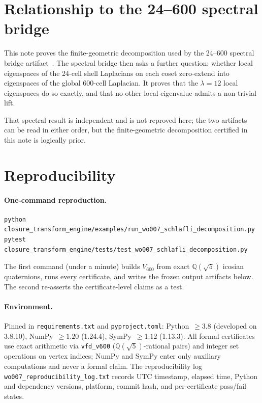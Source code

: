 \documentclass[11pt]{article}
\newcommand{\Vsix}{V_{600}}
\theoremstyle{plain}
\theoremstyle{definition}
\begin{document}
\section{Relationship to the 24--600 spectral bridge}

This note proves the finite-geometric decomposition used by the
24--600 spectral bridge artifact~\cite{Smart24600Bridge}.  The
spectral bridge then asks a further question: whether local
eigenspaces of the 24-cell shell Laplacians on each coset
zero-extend into eigenspaces of the global 600-cell Laplacian.  It
proves that the $\lambda{=}12$ local eigenspaces do so exactly, and
that no other local eigenvalue admits a non-trivial lift.

That spectral result is independent and is not reproved here; the
two artifacts can be read in either order, but the finite-geometric
decomposition certified in this note is logically prior.

\section{Reproducibility}\label{sec:repro}

\paragraph{One-command reproduction.}
\begin{verbatim}
python closure_transform_engine/examples/run_wo007_schlafli_decomposition.py
pytest  closure_transform_engine/tests/test_wo007_schlafli_decomposition.py
\end{verbatim}
The first command (under a minute) builds $\Vsix$ from exact
$\mathbb{Q}(\sqrt 5)$ icosian quaternions, runs every certificate,
and writes the frozen output artifacts below.  The second
re-asserts the certificate-level claims as a test.

\paragraph{Environment.}
Pinned in \texttt{requirements.txt} and \texttt{pyproject.toml}:
Python~$\ge 3.8$ (developed on 3.8.10), NumPy~$\ge 1.20$ (1.24.4),
SymPy~$\ge 1.12$ (1.13.3).  All formal certificates use exact
arithmetic via \texttt{vfd\_v600} ($\mathbb{Q}(\sqrt 5)$-rational
pairs) and integer set operations on vertex indices; NumPy and
SymPy enter only auxiliary computations and never a formal claim.
The reproducibility log
\texttt{wo007\_reproducibility\_log.txt} records UTC timestamp,
elapsed time, Python and dependency versions, platform, commit
hash, and per-certificate pass/fail states.
\end{document}
